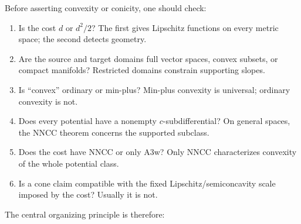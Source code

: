 \documentclass[11pt,a4paper]{article}
\theoremstyle{definition}
\theoremstyle{remark}
\begin{document}
Before asserting convexity or conicity, one should check:
\begin{enumerate}[label=\arabic*.]
  \item Is the cost $d$ or $d^2/2$? The first gives Lipschitz functions on
  every metric space; the second detects geometry.
  \item Are the source and target domains full vector spaces, convex subsets,
  or compact manifolds? Restricted domains constrain supporting slopes.
  \item Is ``convex'' ordinary or min-plus? Min-plus convexity is universal;
  ordinary convexity is not.
  \item Does every potential have a nonempty $c$-subdifferential? On general
  spaces, the NNCC theorem concerns the supported subclass.
  \item Does the cost have NNCC or only A3w? Only NNCC characterizes convexity
  of the whole potential class.
  \item Is a cone claim compatible with the fixed Lipschitz/semiconcavity scale
  imposed by the cost? Usually it is not.
\end{enumerate}

The central organizing principle is therefore:
\begin{center}
\end{center}



\end{document}
